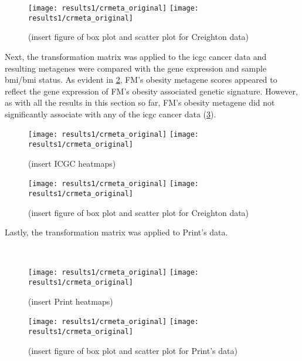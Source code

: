 \begin{figure}[htp!]
	\centering
	\texttt{[image: results1/crmeta\_original]}
	\hfill
	\texttt{[image: results1/crmeta\_original]}
	\caption[FM metagene and sample \gls{bmi}/\gls{bmi} status in Creighton's data]{(insert figure of box plot and scatter plot for Creighton data)}
	\label{fig:fmmetaboxcr1}
\end{figure}

Next, the transformation matrix was applied to the \gls{icgc} cancer data and resulting metagenes were compared with the gene expression and sample \gls{bmi}/\gls{bmi} status.
As evident in \cref{fig:fmmetaicgc1}, FM's obesity metagene scores appeared to reflect the gene expression of FM's obesity associated genetic signature.
However, as with all the results in this section so far, FM's obesity metagene did not significantly associate with any of the \gls{icgc} cancer data (\cref{fig:fmmetaboxicgc1}).

\begin{figure}[htp!]
	\centering
	\texttt{[image: results1/crmeta\_original]}
	\hfill
	\texttt{[image: results1/crmeta\_original]}
	\caption[FM metagene and \gls{icgc} cancer data]{(insert ICGC heatmaps)}
	\label{fig:fmmetaicgc1}
\end{figure}

\begin{figure}[htp!]
	\centering
	\texttt{[image: results1/crmeta\_original]}
	\hfill
	\texttt{[image: results1/crmeta\_original]}
	\caption[FM metagene and sample \gls{bmi}/\gls{bmi} status in \gls{icgc} data]{(insert figure of box plot and scatter plot for Creighton data)}
	\label{fig:fmmetaboxicgc1}
\end{figure}

Lastly, the transformation matrix was applied to Print's data.

\\

\begin{figure}[htp!]
	\centering
	\texttt{[image: results1/crmeta\_original]}
	\hfill
	\texttt{[image: results1/crmeta\_original]}
	\caption[FM metagene and Print's cancer data]{(insert Print heatmaps)}
	\label{fig:fmmetacris1}
\end{figure}

\begin{figure}[htp!]
	\centering
	\texttt{[image: results1/crmeta\_original]}
	\hfill
	\texttt{[image: results1/crmeta\_original]}
	\caption[FM metagene and sample \gls{bmi}/\gls{bmi} status in Print's data]{(insert figure of box plot and scatter plot for Print's data)}
	\label{fig:fmmetaboxcris1}
\end{figure}


